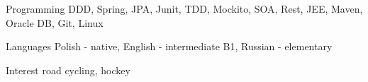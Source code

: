 

\begin{cvskills}

  \cvskill
    {Programming} %
    {DDD, Spring, JPA, Junit, TDD, Mockito, SOA, Rest, JEE, Maven, Oracle DB, Git, Linux} %

  \cvskill
    {Languages} %
    {Polish - native, English - intermediate B1,  Russian - elementary } %


  \cvskill
    {Interest} %
    {road cycling, hockey} %

\end{cvskills}
